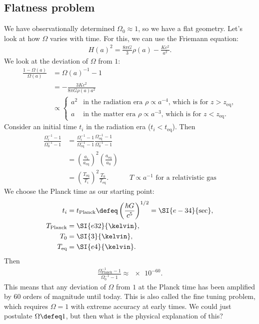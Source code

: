 \subsection{Flatness problem}
We have observationally determined $\Omega_0 \approx 1$, so we have a flat geometry. Let's look at how $\Omega$ varies with time. For this, we can use the Friemann equation:
\begin{align*}
	H(a)^2 = \frac{8\pi G}{3} \rho(a) - \frac{Kc^2}{a^2}.
\end{align*}
We look at the deviation of $\Omega$ from $1$:
\begin{align*}
	\frac{1 - \Omega(a)}{\Omega(a)}
	&= \Omega(a)^{-1} - 1\\
	&= -\frac{3Kc^2}{8\pi G \rho(a)a^2}\\
	&\propto
	\begin{cases}
		a^2 &\text{in the radiation era } \rho \propto a^{-4} \text{, which is for } z > z_\text{eq},\\
		a & \text{in the matter era } \rho \propto a^{-3} \text{, which is for } z < z_\text{eq}.
	\end{cases}
\end{align*}
Consider an initial time $t_i$ in the radiation era ($t_i < t_\text{eq}$).
Then
\begin{align*}
	\frac{\Omega_i^{-1} - 1}{\Omega_0^{-1} - 1}
	&= \frac{\Omega_i^{-1} - 1}{\Omega_\text{eq}^{-1} -1}
	\frac{\Omega_\text{eq}^{-1}-1}{\Omega_0^{-1}-1}\\
	&= 
	\left( \frac{a_i}{a_\text{eq}} \right)^2 
	\left( \frac{a_\text{eq}}{a_0} \right)\\
	&= \left( \frac{T_\text{eq}}{T_i} \right)^2
	\frac{T_0}{T_\text{eq}}.
	&& T \propto a^{-1} \text{ for a relativistic gas}
\end{align*}
We choose the Planck time as our starting point:
\begin{align*}
	t_i &= t_\text{Planck}
	\defeq 
	\left( \frac{\hbar G}{c^5} \right)^{1/2} = \SI{e-34}{\sec},\\
	T_\text{Planck} &= \SI{e32}{\kelvin},\\
	T_0 &= \SI{3}{\kelvin},\\
	T_\text{eq} &= \SI{e4}{\kelvin}.
\end{align*}
Then
\begin{align*}
	\frac{\Omega_\text{Planck}^{-1} - 1}{\Omega_0^{-1}-1} \approx \num{e-60}.
\end{align*}
This means that any deviation of $\Omega$ from $1$ at the Planck time has been amplified by $60$ orders of magnitude until today. This is also called the fine tuning problem, which requires $\Omega=1$ with extreme accuracy at early times. We could just postulate $\Omega \defeq 1$, but then what is the physical explanation of this?



